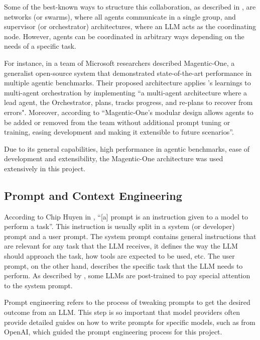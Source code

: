 \documentclass[a4paper]{report}
\begin{document}
Some of the best-known ways to structure this collaboration, as described in \cite{langgraphagmultiagentsystems}, are networks (or swarms), where all agents communicate in a single group, and supervisor (or orchestrator) architectures, where an LLM acts as the coordinating node. However, agents can be coordinated in arbitrary ways depending on the needs of a specific task.

For instance, in \cite{fourney2024magenticone} a team of Microsoft researchers described Magentic-One, a generalist open-source system that demonstrated state-of-the-art performance in multiple agentic benchmarks. Their proposed architecture applies \cite{shinn2023reflexion}'s learnings to multi-agent orchestration by implementing ``a multi-agent architecture where a lead agent, the Orchestrator, plans, tracks progress, and re-plans to recover from errors". Moreover, according to \cite{fourney2024magenticone} ``Magentic-One's modular design allows agents to be added or removed from the team without additional prompt tuning or training, easing development and making it extensible to future scenarios''.

Due to its general capabilities, high performance in agentic benchmarks, ease of development and extensibility, the Magentic-One architecture was used extensively in this project.

\subsection{Prompt and Context Engineering}
\label{sec:prompt-enginering}

According to Chip Huyen in \cite{aiebook2025}, ``[a] prompt is an instruction given to a model to perform a task''. This instruction is usually split in a system (or developer) prompt and a user prompt. The system prompt contains general instructions that are relevant for any task that the LLM receives, it defines the way the LLM should approach the task, how tools are expected to be used, etc. The user prompt, on the other hand, describes the specific task that the LLM needs to perform. As described by \cite{wallace2024instructionhierarchytrainingllms}, some LLMs are post-trained to pay special attention to the system prompt.

Prompt engineering refers to the process of tweaking prompts to get the desired outcome from an LLM. This step is so important that model providers often provide detailed guides on how to write prompts for specific models, such as \cite{openai2025promptengineering} from OpenAI, which guided the prompt engineering process for this project.
\end{document}
